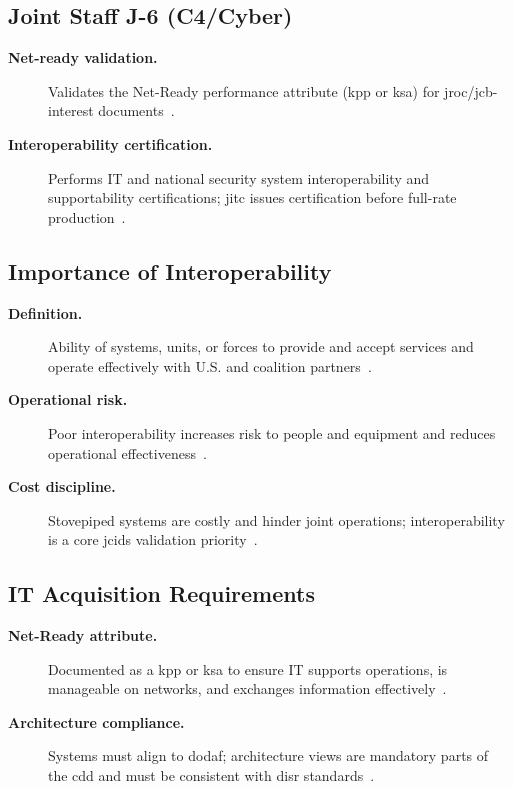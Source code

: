 \documentclass[../main.tex]{subfiles}
\begin{document}
\subsection{Joint Staff J-6 (C4/Cyber)}
\begin{description}
  \item[\textbf{Net-ready validation.}] Validates the Net-Ready performance attribute (\ac{kpp} or \ac{ksa}) for \ac{jroc}/\ac{jcb}-interest documents~\autocite{edo-3-3-3-jcids-2025}.
  \item[\textbf{Interoperability certification.}] Performs IT and national security system interoperability and supportability certifications; \ac{jitc} issues certification before full-rate production~\autocite{edo-3-3-3-jcids-2025}.
\end{description}

\subsection{Importance of Interoperability}
\begin{description}
  \item[\textbf{Definition.}] Ability of systems, units, or forces to provide and accept services and operate effectively with U.S. and coalition partners~\autocite{edo-3-3-3-jcids-2025}.
  \item[\textbf{Operational risk.}] Poor interoperability increases risk to people and equipment and reduces operational effectiveness~\autocite{edo-3-3-3-jcids-2025}.
  \item[\textbf{Cost discipline.}] Stovepiped systems are costly and hinder joint operations; interoperability is a core \ac{jcids} validation priority~\autocite{edo-3-3-3-jcids-2025}.
\end{description}

\subsection{IT Acquisition Requirements}
\begin{description}
  \item[\textbf{Net-Ready attribute.}] Documented as a \ac{kpp} or \ac{ksa} to ensure IT supports operations, is manageable on networks, and exchanges information effectively~\autocite{edo-3-3-3-jcids-2025}.
  \item[\textbf{Architecture compliance.}] Systems must align to \ac{dodaf}; architecture views are mandatory parts of the \ac{cdd} and must be consistent with \ac{disr} standards~\autocite{edo-3-3-3-jcids-2025}.
\end{description}
\end{document}
